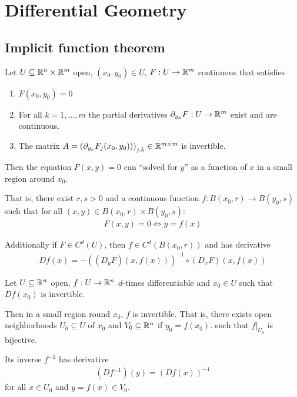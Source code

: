 \section{Differential Geometry}

\subsection{Implicit function theorem}


\begin{bthm}
  Let $U \subseteq \mathbb{R}^{n} \times \mathbb{R}^{m}$ open, $(x_0,y_0) \in U$, $F: U \to \mathbb{R}^{m}$ continuous that satisfies
  \begin{enumerate}
    \item $F(x_0,y_0) = 0$
    \item For all $k = 1, \ldots, m$ the partial derivatives $\partial_{y_k}F: U \to \mathbb{R}^{m}$ exist and are continuous.
    \item The matrix $A = \left(
        \partial_{y_k}F_j(x_0,y_0))
    \right)_{j,k} \in \mathbb{R}^{m \times m}$ is invertible.
  \end{enumerate}
  Then the equation $F(x,y) = 0$ can ``solved for $y$'' as a function of $x$ in a small region around $x_0$.

  That is, there exist $r,s >0$ and a continuous function $f:B(x_0,r) \to B(y_0,s)$ such that for all $(x,y) \in B(x_0,r) \times B(y_0,s)$:
  \begin{align*}
    F(x,y) = 0 \iff y=f(x)
  \end{align*}

  Additionally if $F \in C^{d}(U)$, then $f \in C^{d}(B(x_0,r))$ and has derivative
  \begin{align*}
    Df(x) = - \left(
      (D_yF)(x,f(x))
    \right)^{-1} \circ (D_xF)(x,f(x))
  \end{align*}
\end{bthm}



\begin{bthm}
Let $U \subseteq \mathbb{R}^{n}$ open, $f: U \to  \mathbb{R}^{n}$ $d$-times differentiable and $x_0 \in U$ such that $Df(x_0)$ is invertible.

Then in a small region round $x_0$, $f$ is invertible. That is, there exists open neighborhoods $U_0 \subseteq U$ of $x_0$ and $V_0 \subseteq \mathbb{R}^{n}$ if $y_0 = f(x_0)$. such that $f|_{U_0}$ is bijective.

Its inverse $f^{-1}$ has derivative
\begin{align*}
  (Df^{-1})(y) = (Df(x))^{-1}
\end{align*}
for all $x \in U_0$ and $y = f(x) \in V_0$.


\end{bthm}



